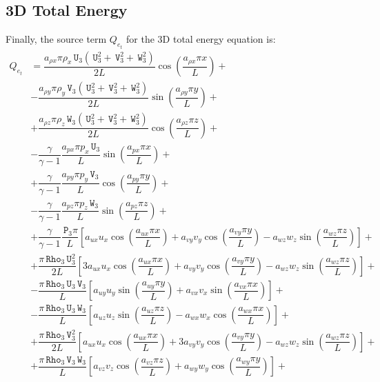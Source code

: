 \documentclass[10pt]{article}
\newcommand{\Rho}{\,\mathtt{Rho}}
\newcommand{\PP}{\,\mathtt{P}}
\newcommand{\U}{\,\mathtt{U}}
\newcommand{\V}{\,\mathtt{V}}
\newcommand{\W}{\,\mathtt{W}}
\begin{document}
\subsection{3D Total Energy}

Finally, the source term $Q_{e_t}$ for the 3D total energy equation is:
\begin{equation}
 \begin{split}\label{eq:euler_3d_e}
Q_{e_t} &= \dfrac{a_{\rho x} \pi \rho_x \U_3 (\U_3^2+\V_3^2+\W_3^2)}{2L}\cos\left(\dfrac{a_{\rho x} \pi x}{L}\right)+\\
&- \dfrac{a_{\rho y} \pi \rho_y \V_3 (\U_3^2+\V_3^2+\W_3^2)}{2L}\sin\left(\dfrac{a_{\rho y} \pi y}{L}\right)+\\
&+  \dfrac{a_{\rho z} \pi \rho_z \W_3 (\U_3^2+\V_3^2+\W_3^2)}{2L}\cos\left(\dfrac{a_{\rho z} \pi z}{L}\right)+\\
&-\dfrac{\gamma}{\gamma-1}\dfrac{a_{px} \pi p_x  \U_3}{L}\sin\left(\dfrac{a_{px} \pi x}{L}\right) +\\
&+\dfrac{\gamma}{\gamma-1}\dfrac{a_{py} \pi p_y \V_3}{L}\cos\left(\dfrac{a_{py} \pi y}{L}\right) +\\
&-\dfrac{\gamma}{\gamma-1}\dfrac{a_{pz}\pi  p_z  \W_3}{L}\sin\left(\dfrac{a_{pz} \pi z}{L}\right) +\\
&+ \dfrac{\gamma}{\gamma-1}\dfrac{\PP_3 \pi}{L}\left[a_{ux} u_x \cos\left(\dfrac{a_{ux} \pi x}{L}\right)+a_{vy} v_y \cos\left(\dfrac{a_{vy} \pi y}{L}\right)-a_{wz} w_z \sin\left(\dfrac{a_{wz} \pi z}{L}\right)\right] +\\
&+\dfrac{\pi \Rho_3 \U_3^2}{2L}\left[3 a_{ux} u_x \cos\left(\dfrac{a_{ux} \pi x}{L}\right)+a_{vy} v_y \cos\left(\dfrac{a_{vy} \pi y}{L}\right)-a_{wz} w_z \sin\left(\dfrac{a_{wz} \pi z}{L}\right)\right]+\\
&-\dfrac{\pi \Rho_3 \U_3 \V_3}{L}\left[a_{uy} u_y \sin\left(\dfrac{a_{uy} \pi y}{L}\right)+a_{vx} v_x \sin\left(\dfrac{a_{vx} \pi x}{L}\right)\right] +\\
&-\dfrac{\pi \Rho_3 \U_3 \W_3}{L}\left[a_{uz} u_z \sin\left(\dfrac{a_{uz} \pi z}{L}\right)-a_{wx} w_x \cos\left(\dfrac{a_{wx} \pi x}{L}\right)\right] +\\
&+\dfrac{\pi \Rho_3 \V_3^2}{2L}\left[a_{ux} u_x \cos\left(\dfrac{a_{ux} \pi x}{L}\right)+3 a_{vy} v_y \cos\left(\dfrac{a_{vy} \pi y}{L}\right)-a_{wz} w_z \sin\left(\dfrac{a_{wz} \pi z}{L}\right)\right] +\\
&+ \dfrac{\pi \Rho_3 \V_3 \W_3}{L}\left[a_{vz} v_z \cos\left(\dfrac{a_{vz} \pi z}{L}\right)+a_{wy} w_y \cos\left(\dfrac{a_{wy} \pi y}{L}\right)\right]+\\

\end{split}
\end{equation}
\end{document}
